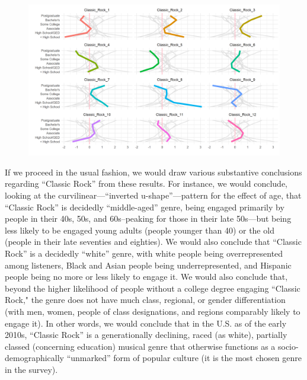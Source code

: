 \documentclass[a4paper,12pt]{extarticle}
\begin{document}
\begin{figure}[ht!]
    \centering
    \includegraphics[width=1.0\textwidth]{Figs/Link Clust/classic-rock-educ.png}
    \caption{}
    \label{fig:educ}
\end{figure}

If we proceed in the usual fashion, we would draw various substantive conclusions regarding ``Classic Rock'' from these results. For instance, we would conclude, looking at the curvilinear---``inverted u-shape''---pattern for the effect of age, that ``Classic Rock'' is decidedly ``middle-aged'' genre, being engaged primarily by people in their 40s, 50s, and 60s--peaking for those in their late 50s---but being less likely to be engaged young adults (people younger than 40) or the old (people in their late seventies and eighties). We would also conclude that ``Classic Rock'' is a decidedly ``white'' genre, with white people being overrepresented among listeners, Black and Asian people being underrepresented, and Hispanic people being no more or less likely to engage it. We would also conclude that, beyond the higher likelihood of people without a college degree engaging ``Classic Rock," the genre does not have much class, regional, or gender differentiation (with men, women, people of class designations, and regions comparably likely to engage it). In other words, we would conclude that in the U.S. as of the early 2010s, ``Classic Rock'' is a generationally declining, raced (as white), partially classed (concerning education) musical genre that otherwise functions as a socio-demographically ``unmarked'' form of popular culture (it is the most chosen genre in the survey). 
\end{document}
